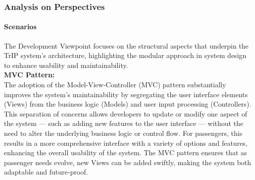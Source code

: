 \subsubsection{Analysis on Perspectives}
\begin{table}[h!]
    \centering
    \caption{Development View Prioritized Quality Attributes}
    \label{tab:development_view}
\end{table}


\paragraph{Scenarios}

The Development Viewpoint focuses on the structural aspects that underpin the TrIP system's architecture, highlighting the modular approach in system design to enhance usability and maintainability. \\

\noindent \textbf{MVC Pattern:} \\
The adoption of the Model-View-Controller (MVC) pattern substantially improves the system's maintainability by segregating the user interface elements (Views) from the business logic (Models) and user input processing (Controllers). This separation of concerns allows developers to update or modify one aspect of the system — such as adding new features to the user interface — without the need to alter the underlying business logic or control flow. For passengers, this results in a more comprehensive interface with a variety of options and features, enhancing the overall usability of the system. The MVC pattern ensures that as passenger needs evolve, new Views can be added swiftly, making the system both adaptable and future-proof. \\

